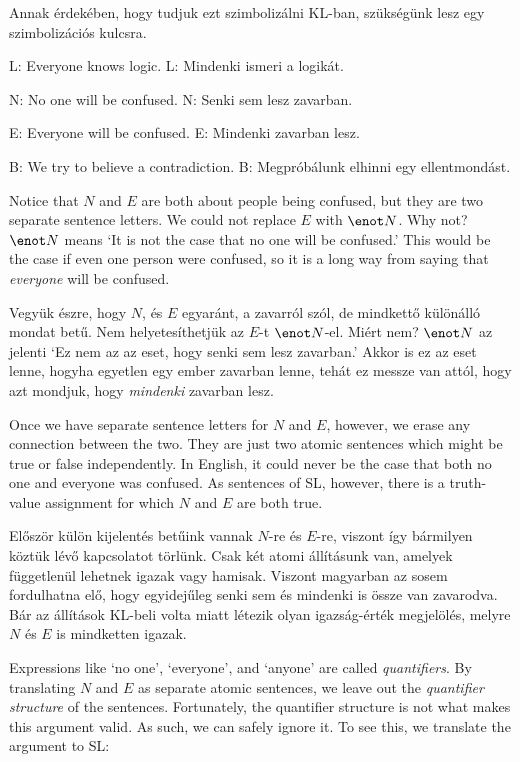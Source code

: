 Annak érdekében, hogy tudjuk ezt szimbolizálni KL-ban, szükségünk lesz egy szimbolizációs kulcsra.
\begin{ekey}
\item[L:] Everyone knows logic.
L: Mindenki ismeri a logikát.
\item[N:] No one will be confused.
N: Senki sem lesz zavarban.
\item[E:] Everyone will be confused.
E: Mindenki zavarban lesz.
\item[B:] We try to believe a contradiction.
B: Megpróbálunk elhinni egy ellentmondást.
\end{ekey}
Notice that $N$ and $E$ are both about people being confused, but they are two separate sentence letters. We could not replace $E$ with $\enot N$. Why not? $\enot N$ means `It is not the case that no one will be confused.' This would be the case if even one person were confused, so it is a long way from saying that \emph{everyone} will be confused.

Vegyük észre, hogy $N$, és $E$ egyaránt, a zavarról szól, de mindkettő különálló mondat betű. Nem helyetesíthetjük az $E$-t $\enot N$-el.  Miért nem?  $\enot N$ az jelenti  ‘Ez nem az az eset, hogy senki sem lesz zavarban.’ Akkor is ez az eset lenne, hogyha egyetlen egy ember zavarban lenne, tehát ez messze van attól, hogy azt mondjuk, hogy \emph{mindenki} zavarban lesz.



Once we have separate sentence letters for $N$ and $E$, however, we erase any connection between the two. They are just two atomic sentences which might be true or false independently. In English, it could never be the case that both no one and everyone was confused. As sentences of SL, however, there is a truth-value assignment for which $N$ and $E$ are both true.

Először külön kijelentés betűink vannak $N$-re és $E$-re, viszont így bármilyen köztük lévő kapcsolatot törlünk. Csak két atomi állításunk van, amelyek függetlenül lehetnek igazak vagy hamisak. Viszont magyarban az sosem fordulhatna elő, hogy egyidejűleg senki sem és mindenki is össze van zavarodva. Bár az állítások KL-beli volta miatt létezik olyan igazság-érték megjelölés, melyre $N$ és $E$ is mindketten igazak.

Expressions like `no one', `everyone', and `anyone' are called \emph{quantifiers}. By translating $N$ and $E$ as separate atomic sentences, we leave out the \emph{quantifier structure} of the sentences. Fortunately, the quantifier structure is not what makes this argument valid. As such, we can safely ignore it. To see this, we translate the argument to SL:

